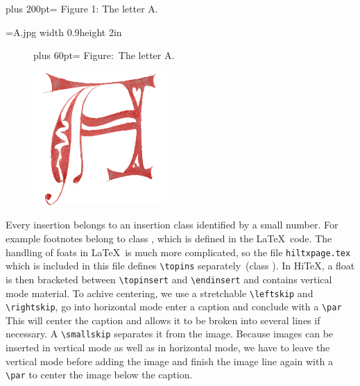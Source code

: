 \documentclass{article}      %
\def\caption#1{\noindent\leftskip=0pt plus 60pt\rightskip=\leftskip
  \parfillskip=0pt\relax Figure:~#1\par\smallskip}
\begin{document}
\ifhint
  \topinsert %
  \leftskip=0pt plus 200pt\rightskip=\leftskip %
  \parfillskip=0pt\parindent=0pt              %
   Figure 1: The letter A.\par %
   \smallskip
   \leavevmode\HINTimage=A.jpg width 0.9\hsize height 2in\par
  \endinsert
\else
  \begin{figure}[t]
  \centering
  \caption{The letter A.}
  \includegraphics[height=2in]{A.jpg}
  \end{figure}
\fi
Every insertion belongs to an insertion class identified by a
small number. For example footnotes belong to class \the\footins,
which is defined in the \LaTeX\ code.
The handling of foats in \LaTeX\ is much more complicated, so the
file {\tt hiltxpage.tex} which is included in this file defines
\verb/\topins/ separately\ifhint~(class \the\topins)\fi.
In Hi\TeX, a float is then bracketed between \verb/\topinsert/ and \verb/\endinsert/
and contains vertical mode material. To achive centering,
we use a stretchable \verb/\leftskip/ and \verb/\rightskip/,
go into horizontal mode enter a caption and conclude with a \verb/\par/
This will center the caption and allows it to be broken into several lines
if necessary. A \verb/\smallskip/ separates it from the image.
Because images can be inserted in vertical mode as well as in
horizontal mode, we have to leave the vertical mode before adding
the image and finish the image line again with a \verb/\par/ to center
the image below the caption.
\end{document}
